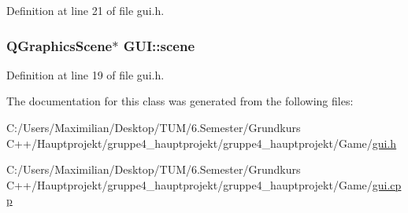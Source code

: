 Definition at line 21 of file gui.\+h.

\subsubsection[{\texorpdfstring{scene}{scene}}]{\setlength{\rightskip}{0pt plus 5cm}Q\+Graphics\+Scene$\ast$ G\+U\+I\+::scene}\hypertarget{class_g_u_i_a52022e4c94d0e0378ed17b2348ed02db}{}\label{class_g_u_i_a52022e4c94d0e0378ed17b2348ed02db}


Definition at line 19 of file gui.\+h.



The documentation for this class was generated from the following files\+:\begin{DoxyCompactItemize}
\item 
C\+:/\+Users/\+Maximilian/\+Desktop/\+T\+U\+M/6.\+Semester/\+Grundkurs C++/\+Hauptprojekt/gruppe4\+\_\+hauptprojekt/gruppe4\+\_\+hauptprojekt/\+Game/\hyperlink{gui_8h}{gui.\+h}\item 
C\+:/\+Users/\+Maximilian/\+Desktop/\+T\+U\+M/6.\+Semester/\+Grundkurs C++/\+Hauptprojekt/gruppe4\+\_\+hauptprojekt/gruppe4\+\_\+hauptprojekt/\+Game/\hyperlink{gui_8cpp}{gui.\+cpp}\end{DoxyCompactItemize}

